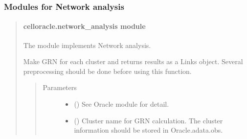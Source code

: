 \documentclass[letterpaper,10pt,english]{sphinxmanual}
\begin{document}
\subsubsection{Modules for Network analysis}
\label{\detokenize{modules/celloracle:modules-for-network-analysis}}\begin{quote}


\paragraph{celloracle.network\_analysis module}
\label{\detokenize{modules/celloracle.network_analysis:module-celloracle.network_analysis}}\label{\detokenize{modules/celloracle.network_analysis:celloracle-network-analysis-module}}\label{\detokenize{modules/celloracle.network_analysis::doc}}
The {\hyperref[\detokenize{modules/celloracle.network_analysis:module-celloracle.network_analysis}]{}} module implements Network analysis.

\begin{fulllineitems}
\label{\detokenize{modules/celloracle.network_analysis:celloracle.network_analysis.get_links}}
Make GRN for each cluster and returns results as a Links object.
Several preprocessing should be done before using this function.
\begin{quote}\begin{description}
\item[{Parameters}] \leavevmode\begin{itemize}
\item {} 
 ({\hyperref[\detokenize{modules/celloracle:celloracle.Oracle}]{}}) \textendash{} See Oracle module for detail.

\item {} 
 () \textendash{} Cluster name for GRN calculation. The cluster information should be stored in Oracle.adata.obs.


\end{itemize}
\end{description}
\end{quote}
\end{fulllineitems}
\end{quote}
\end{document}
